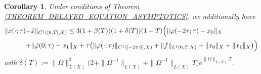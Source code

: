 \documentclass[12pt]{article}
\newtheorem{corollary}[theorem]{Corollary}
\numberwithin{equation}{section}
\numberwithin{equation}{section}
\begin{document}
	\begin{corollary}
		Under conditions of Theorem \ref{THEOREM_DELAYED_EQUATION_ASYMPTOTICS}, we additionally have
		\begin{equation}
			\begin{split}
				\|x(\cdot; \tau) - &\bar{x}\|_{C^{1}([0, T], X)} \leq 3 (1 + \beta(T))(1 + \delta(T)) (1 + T) \Big(
				\|\varphi(-2\tau; \tau) - x_{0}\|_{X} \\
				+ &\|\dot{\varphi}(0; \tau) - x_{1}\|_{X} + \tau\big(\|\varphi(\cdot; \tau)\|_{C^{1}([-2\tau, 0], X)} + \|f\|_{L^{1}(0, T; X)} + \|x_{0}\|_{X} + \|x_{1}\|_{X}\big)\Big)
			\end{split}
			\notag
		\end{equation}
		with $\delta(T) := \|\Omega\|_{L(X)}^{2} \big(2 + \|\Omega^{-1}\|_{L(X)} + \|\Omega^{-1}\|_{L(X)} T\big) e^{\|\Omega\|_{L(X)} T}$.
	\end{corollary}
\end{document}

